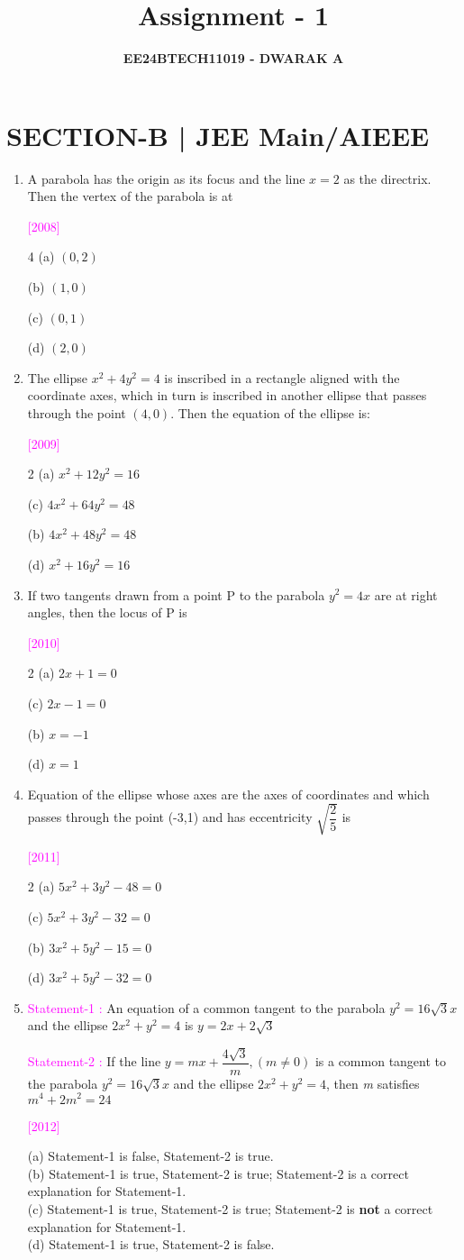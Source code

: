\documentclass[journal,12pt,twocolumn]{IEEEtran}
\theoremstyle{remark}
\newcommand{\questionA}[6]{
\item #1
    \begin{flushright}
        {\textcolor{magenta}{[#2]}}
    \end{flushright}
    (a) #3\\
    (b) #4\\
    (c) #5\\
    (d) #6\\
}
\newcommand{\questionB}[6]{
\item #1
    \begin{flushright}
        {\textcolor{magenta}{[#2]}}
    \end{flushright}
    \begin{multicols}{2}
        (a) #3
        
        (c) #5
        
        (b) #4
        
        (d) #6
    \end{multicols}
}
\newcommand{\questionC}[6]{
\item #1
    \begin{flushright}
        {\textcolor{magenta}{[#2]}}
    \end{flushright}
    \begin{multicols}{4}
        (a) #3
        
        (b) #4
        
        (c) #5
        
        (d) #6
    \end{multicols}
}
\begin{document}

\vspace{3cm}

\title{\textbf{Assignment - 1}}
    \author{\textbf{EE24BTECH11019 - DWARAK A}}
\maketitle
\newpage
\bigskip

\renewcommand{\thefigure}{\theenumi}
\renewcommand{\thetable}{\theenumi}

\section*{\textbf{SECTION-B | JEE Main/AIEEE}}
\bigskip

\begin{enumerate}[label=\textcolor{magenta}{\arabic*.}]

\questionC{A parabola has the origin as its focus and the line $x=2$ as the directrix. Then the vertex of the parabola is at}{2008}
{$(0,2)$}
{$(1,0)$}
{$(0,1)$}
{$(2,0)$}

\questionB{The ellipse $x^2+4y^2=4$ is inscribed in a rectangle aligned with the coordinate axes, which in turn is inscribed in another ellipse that passes through the point $(4,0)$. Then the equation of the ellipse is:}{2009}
{$x^2+12y^2=16$}
{$4x^2+48y^2=48$}
{$4x^2+64y^2=48$}
{$x^2+16y^2=16$}

\questionB{If two tangents drawn from a point P to the parabola $y^2=4x$ are at right angles, then the locus of P is}{2010}
{$2x+1=0$}
{$x=-1$}
{$2x-1=0$}
{$x=1$}

\questionB{Equation of the ellipse whose axes are the axes of coordinates and which passes through the point (-3,1) and has eccentricity $\sqrt{\dfrac{2}{5}}$ is}{2011}
{$5x^2+3y^2-48=0$}
{$3x^2+5y^2-15=0$}
{$5x^2+3y^2-32=0$}
{$3x^2+5y^2-32=0$}

\questionA{\textcolor{magenta}{Statement-1 :} An equation of a common tangent to the parabola $y^2=16\sqrt{3}x$ and the ellipse $2x^2+y^2=4$ is $y=2x+2\sqrt{3}$ 

\textcolor{magenta}{Statement-2 :} If the line $y=mx+\dfrac{4\sqrt{3}}{m},(m\neq0)$ is a common tangent to the parabola $y^2=16\sqrt{3}x$ and the ellipse $2x^2+y^2=4$, then \textit{m} satisfies $m^4+2m^2=24$}{2012}
{Statement-1 is false, Statement-2 is true.}
{Statement-1 is true, Statement-2 is true; Statement-2 is a correct explanation for Statement-1.}
{Statement-1 is true, Statement-2 is true; Statement-2 is \textbf{not} a correct explanation for Statement-1.}
{Statement-1 is true, Statement-2 is false.}


\end{enumerate}
\end{document}
